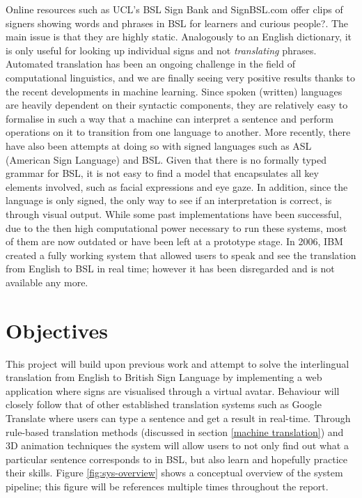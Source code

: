 \documentclass[12pt]{ociamthesis}  %
\begin{document}
Online resources such as UCL's BSL Sign Bank  and SignBSL.com  offer clips of signers showing words and phrases in BSL for learners and curious people?. The main issue is that they are highly static. Analogously to an English dictionary, it is only useful for looking up individual signs and not \textit{translating} phrases. Automated translation has been an ongoing challenge in the field of
computational linguistics, and we are finally seeing very positive results thanks to the recent developments in machine learning. Since spoken (written) languages are heavily dependent on their syntactic components, they are relatively easy to formalise in such a way that a machine can interpret a sentence and perform operations on it to transition from one language to another. More recently, there have also been attempts at doing so with signed languages such as ASL (American Sign Language) and BSL. Given that there is no formally typed grammar for BSL, it is not easy to find a model that encapsulates all key elements involved, such as facial expressions and eye gaze. In addition, since the language is only signed, the only way to see if an interpretation is correct, is through visual output. While some past implementations have been successful, due to the then high computational power necessary to run these systems, most of them are now outdated or have been left at a prototype stage. In 2006, IBM created a fully working system  that allowed users to speak and see the translation from English to BSL in real time; however it has been disregarded and is not available any more. 

\section{Objectives}
This project will build upon previous work and attempt to solve the interlingual translation from English to British Sign Language by implementing a web application where signs are visualised through a virtual avatar. Behaviour will closely follow that of other established translation systems such as Google Translate where users can type a sentence and get a result in real-time. Through rule-based translation methods (discussed in section \ref{machine translation}) and 3D animation techniques the system will allow users to not only find out what a particular sentence corresponds to in BSL, but also learn and hopefully practice their skills. Figure \ref{fig:sys-overview} shows a conceptual overview of the system pipeline; this figure will be references multiple times throughout the report.
\end{document}
